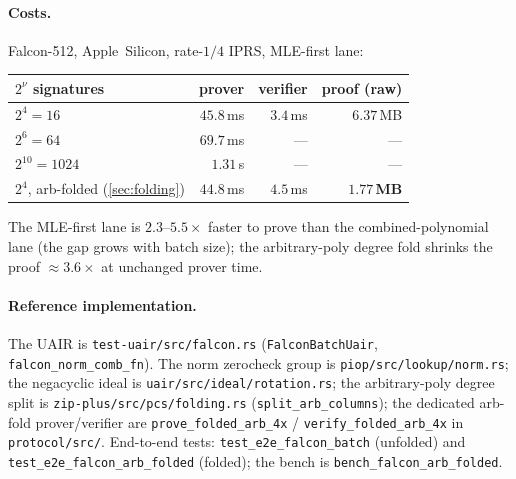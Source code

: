 \paragraph{Costs.}
Falcon-512, Apple~Silicon, rate-$1/4$ IPRS, MLE-first lane:
\begin{center}
\begin{tabular}{@{}lrrr@{}}
\toprule
$2^{\nu}$ signatures & prover & verifier & proof (raw) \\
\midrule
$2^{4} = 16$    & $45.8$\,ms & $3.4$\,ms & $6.37$\,MB \\
$2^{6} = 64$    & $69.7$\,ms & ---       & --- \\
$2^{10} = 1024$ & $1.31$\,s  & ---       & --- \\
\midrule
$2^{4}$, arb-folded (\cref{sec:folding}) & $44.8$\,ms & $4.5$\,ms & $\mathbf{1.77}$\,\textbf{MB} \\
\bottomrule
\end{tabular}
\end{center}
The MLE-first lane is $2.3$--$5.5\times$ faster to prove than the
combined-polynomial lane (the gap grows with batch size); the
arbitrary-poly degree fold shrinks the proof $\approx 3.6\times$ at
unchanged prover time.

\paragraph{Reference implementation.}
The UAIR is \texttt{test-uair/src/falcon.rs}
(\texttt{FalconBatchUair}, \texttt{falcon\_norm\_comb\_fn}). The
norm zerocheck group is \texttt{piop/src/lookup/norm.rs}; the negacyclic
ideal is \texttt{uair/src/ideal/rotation.rs}; the arbitrary-poly degree
split is \texttt{zip-plus/src/pcs/folding.rs}
(\texttt{split\_arb\_columns}); the dedicated arb-fold prover/verifier are
\texttt{prove\_folded\_arb\_4x} / \texttt{verify\_folded\_arb\_4x} in
\texttt{protocol/src/}. End-to-end tests:
\texttt{test\_e2e\_falcon\_batch} (unfolded) and
\texttt{test\_e2e\_falcon\_arb\_folded} (folded); the bench is
\texttt{bench\_falcon\_arb\_folded}.
